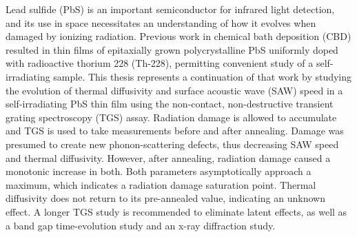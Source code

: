 % 
% 
%
Lead sulfide (PbS) is an important semiconductor for infrared light detection, and its use in space necessitates an understanding of how it evolves when damaged by ionizing radiation. Previous work in chemical bath deposition (CBD) resulted in thin films of epitaxially grown polycrystalline PbS uniformly doped with radioactive thorium 228 (Th-228), permitting convenient study of a self-irradiating sample. This thesis represents a continuation of that work by studying the evolution of thermal diffusivity and surface acoustic wave (SAW) speed in a self-irradiating PbS thin film using the non-contact, non-destructive transient grating spectroscopy (TGS) assay. Radiation damage is allowed to accumulate and TGS is used to take measurements before and after annealing. Damage was presumed to create new phonon-scattering defects, thus decreasing SAW speed and thermal diffusivity. However, after annealing, radiation damage caused a monotonic increase in both. Both parameters asymptotically approach a maximum, which indicates a radiation damage saturation point. Thermal diffusivity does not return to its pre-annealed value, indicating an unknown effect. A longer TGS study is recommended to eliminate latent effects, as well as a band gap time-evolution study and an x-ray diffraction study.
